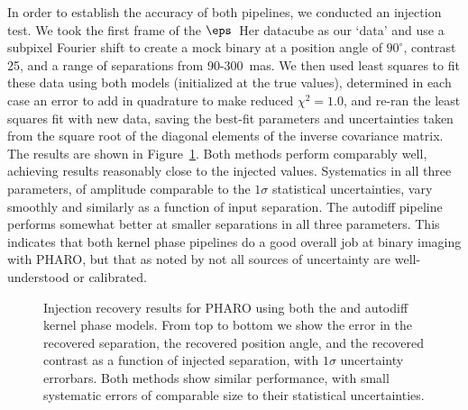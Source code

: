 \documentclass[modern]{aastex63}
\begin{document}
In order to establish the accuracy of both pipelines, we conducted an injection test. We took the first frame of the $\eps$~Her datacube as our `data' and use a subpixel Fourier shift to create a mock binary at a position angle of $90^\circ$, contrast 25, and a range of separations from 90-300~mas. We then used least squares to fit these data using both models (initialized at the true values), determined in each case an error to add in quadrature to make reduced $\chi^2=1.0$, and re-ran the least squares fit with new data, saving the best-fit parameters and uncertainties taken from the square root of the diagonal elements of the inverse covariance matrix. The results are shown in Figure~\ref{injection_recovery}. Both methods perform comparably well, achieving results reasonably close to the injected values. Systematics in all three parameters, of amplitude comparable to the $1\sigma$ statistical uncertainties, vary smoothly and similarly as a function of input separation. The autodiff pipeline performs somewhat better at smaller separations in all three parameters. This indicates that both kernel phase pipelines do a good overall job at binary imaging with PHARO, but that as noted by \citet{martinache20} not all sources of uncertainty are well-understood or calibrated.

\begin{figure}
     \caption{Injection recovery results for PHARO using both the \citet{martinache20} and autodiff kernel phase models. From top to bottom we show the error in the recovered separation, the recovered position angle, and the recovered contrast as a function of injected separation, with $1\sigma$ uncertainty errorbars. Both methods show similar performance, with small systematic errors of comparable size to their statistical uncertainties.}
    \label{injection_recovery}
\end{figure}

\end{document}
